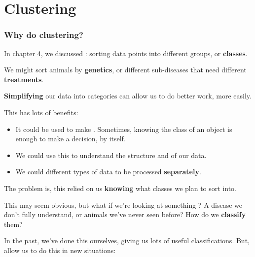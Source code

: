 \setcounter{chapter}{12-1}

\chapter{Clustering}

    \subsection{Why do clustering?}
    
        In chapter 4, we discussed : sorting data points into different groups, or \textbf{classes}. 
        
        \miniex We might sort animals by \textbf{genetics}, or different sub-diseases that need different \textbf{treatments}. 
        
        \textbf{Simplifying} our data into categories can allow us to do better work, more easily.
        
        This has lots of benefits: 
        
        \begin{itemize}
            \item It could be used to make . Sometimes, knowing the class of an object is enough to make a decision, by itself.
        
            \item We could use this to understand the structure and  of our data.
            
            \item We could  different types of data to be processed \textbf{separately}.
        \end{itemize}

        \subsecdiv
        
        The problem is, this relied on us \textbf{knowing} what classes we plan to sort into. 
        
        This may seem obvious, but what if we're looking at something ? A disease we don't fully understand, or animals we've never seen before? How do we \textbf{classify} them?
        
        In the past, we've done this ourselves, giving us lots of useful classifications. But,  allow us to do this in new situations:
        
